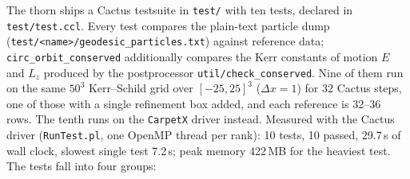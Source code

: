 \documentclass{article}
\begin{document}
The thorn ships a Cactus testsuite in \texttt{test/} with ten tests,
declared in \texttt{test/test.ccl}.  Every test compares the plain-text
particle dump (\texttt{test/<name>/geodesic\_particles.txt}) against
reference data; \texttt{circ\_orbit\_conserved} additionally compares
the Kerr constants of motion $E$ and $L_z$ produced by the
postprocessor \texttt{util/check\_conserved}.  Nine of them run on the
same $50^3$ Kerr--Schild grid over $[-25,25]^3$ ($\Delta x = 1$) for 32
Cactus steps, one of those with a single refinement box added, and each
reference is 32--36 rows.  The tenth runs on the \texttt{CarpetX} driver
instead.  Measured with the Cactus driver (\texttt{RunTest.pl}, one
OpenMP thread per rank): 10 tests, 10 passed, 29.7\,s of wall clock,
slowest single test 7.2\,s; peak memory 422\,MB for the heaviest test.
The tests fall into four groups:
\end{document}
